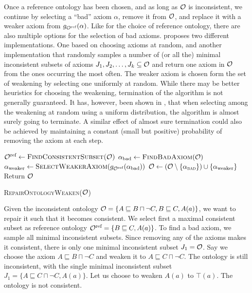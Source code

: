 Once a reference ontology has been chosen, and as long as $\mathcal{O}$ is inconsistent, we continue by selecting a ``bad'' axiom $\alpha$, remove it from $\mathcal{O}$, and replace it with a weaker axiom from $g_{\mathcal{O}^\textnormal{ref}}(\alpha)$. Like for the choice of reference ontology, there are also multiple options for the selection of bad axioms. \cite{troquard2018repairing} proposes two different implementations. One based on choosing axioms at random, and another implementation that randomly samples a number of (or all the) minimal inconsistent subsets of axioms $J_1, J_2, \dots, J_k \subseteq \mathcal{O}$ and return one axiom in $\mathcal{O}$ from the ones occurring the most often. The weaker axiom is chosen form the set of weakening by selecting one uniformly at random. While there may be better heuristics for choosing the weakening, termination of the algorithm is not generally guaranteed. It has, however, been shown in \cite{confalonieri2020towards}, that when selecting among the weakening at random using a uniform distribution, the algorithm is almost surely going to terminate. A similar effect of almost sure termination could also be achieved by maintaining a constant (small but positive) probability of removing the axiom at each step.

\begin{algorithm}[ht]
  \begin{algorithmic}
    \State ${\mathcal{O}^\textnormal{ref}} \gets \textsc{FindConsistentSubset(\ensuremath{\mathcal{O}})}$
      \State $\alpha_\textnormal{bad} \gets \textsc{FindBadAxiom}(\mathcal{O})$
      \State $\alpha_\textnormal{weaker} \gets \textsc{SelectWeakerAxiom}(g_{\mathcal{O}^\textnormal{ref}}(\alpha_\textnormal{bad}))$
      \State $\mathcal{O} \gets (\mathcal{O} \setminus \{\alpha_\textsc{bad}\}) \cup \{\alpha_\textnormal{weaker}\}$
    \EndWhile
    \State Return $\mathcal{O}$
  \end{algorithmic}
  \caption{\textsc{RepairOntologyWeaken}($\mathcal{O}$)}
  \label{algo:repair-weaken-alc}
\end{algorithm}

\begin{example}\label{ex:alc-weakening}
  Given the inconsistent ontology $\mathcal{O} = \{ A \sqsubseteq B \sqcap \lnot C, B \sqsubseteq C, A(a) \}$, we want to repair it such that it becomes consistent. We select first a maximal consistent subset as reference ontology ${\mathcal{O}^\textnormal{ref}} = \{ B \sqsubseteq C, A(a) \}$. To find a bad axiom, we sample all minimal inconsistent subsets. Since removing any of the axioms makes it consistent, there is only one minimal inconsistent subset $J_1 = \mathcal{O}$. Say we choose the axiom $A \sqsubseteq B \sqcap \lnot C$ and weaken it to $A \sqsubseteq C \sqcap \lnot C$. The ontology is still inconsistent, with the single minimal inconsistent subset $J_1 = \{ A \sqsubseteq C \sqcap \lnot C, A(a) \}$. Let us choose to weaken $A(a)$ to $\top(a)$. The ontology is not consistent.
\end{example}

